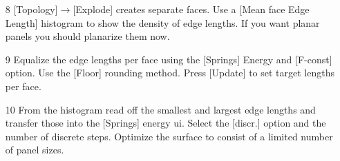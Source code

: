 \documentclass[Thesis.tex]{subfiles}
\begin{document}
\begin{itemize}
\item[8] [Topology]$\to$[Explode] creates separate faces. Use a [Mean face Edge Length] histogram to show the density of edge lengths. If you want planar panels you should planarize them now.

\begin{center}
\begin{minipage}{0.9\linewidth}
            \centering
\end{minipage}
\end{center}

\item[9] Equalize the edge lengths per face using the [Springs] Energy and [F-const] option. Use the [Floor] rounding method. Press [Update] to set target lengths per face.

\begin{center}
\begin{minipage}{0.9\linewidth}
            \centering
\end{minipage}
\end{center}
\item[10] From the histogram read off the smallest and largest edge lengths and transfer those into the [Springs] energy ui. Select the [discr.] option and the number of discrete steps. Optimize the surface to consist of a limited number of panel sizes.

\begin{center}
\begin{minipage}{0.9\linewidth}
            \centering
\end{minipage}
\end{center}            
\end{itemize}
\end{document}
